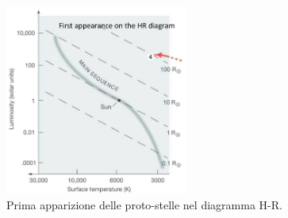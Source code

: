 \documentclass[a4paper,11pt]{article}
\begin{document}
\begin{figure}[h!!]
        \centering
        \includegraphics[width=6cm]{lezione 28 novembre/primaapparizionehr.png}
        \caption{Prima apparizione delle proto-stelle nel diagramma H-R.}
        \label{lezione 28 novembre/primaapparizionehr.png}
    \end{figure}
    \\
\end{document}
